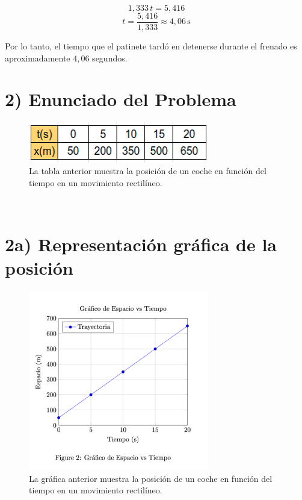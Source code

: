 \documentclass{article}
\begin{document}
\[
1,333 \, t = 5,416 
\]
\[
t = \frac{5,416}{1,333} \approx \boxed{4,06 \, \text{s}}
\]

\justify
Por lo tanto, el tiempo que el patinete tardó en detenerse durante el frenado es aproximadamente \( 4,06 \) segundos.

\section*{2) Enunciado del Problema}


\begin{figure}[h] %
    \centering
    \includegraphics[width=0.7\textwidth]{tabla.png} %
    \caption{La tabla anterior muestra la posición de un coche en función del tiempo en un movimiento rectilíneo.
    }
    \label{fig:tabla}
\end{figure}\


\section*{2a) Representación gráfica de la posición}

\begin{figure}[h] %
    \centering
    \includegraphics[width=0.7\textwidth]{grafico.png} %
    \caption{La gráfica anterior muestra la posición de un coche en función del tiempo en un movimiento rectilíneo.
    }
    \label{fig:grafico}
\end{figure}\
\end{document}
